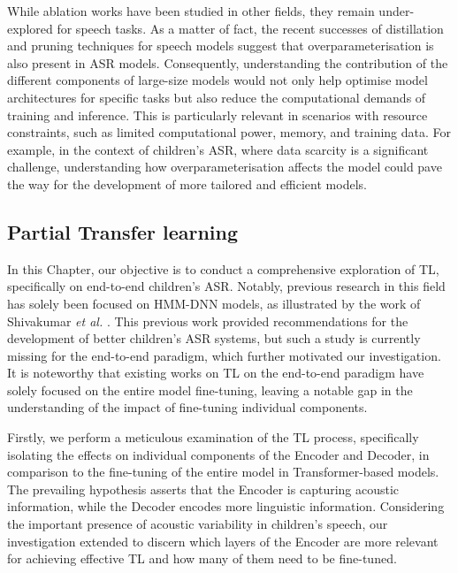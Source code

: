 While ablation works have been studied in other fields, they remain under-explored for speech tasks. As a matter of fact, the recent successes of distillation and pruning techniques for speech models \cite{gandhi2023distilwhisper,chang2022distilhubert,peng23c_interspeech} suggest that overparameterisation is also present in \ac{ASR} models. Consequently, understanding the contribution of the different components of large-size models would not only help optimise model architectures for specific tasks but also reduce the computational demands of training and inference. This is particularly relevant in scenarios with resource constraints, such as limited computational power, memory, and training data. For example, in the context of children's \ac{ASR}, where data scarcity is a significant challenge, understanding how overparameterisation affects the model could pave the way for the development of more tailored and efficient models. %


\subsection{Partial Transfer learning}
In this Chapter, our objective is to conduct a comprehensive exploration of \ac{TL}, specifically on end-to-end children's \ac {ASR}. Notably, previous research in this field has solely been focused on \ac{HMM-DNN} models, as illustrated by the work of Shivakumar \textit{et al.} \cite{shivakumar2020transfer}. This previous work provided recommendations for the development of better children's \ac{ASR} systems, but such a study is currently missing for the end-to-end paradigm, which further motivated our investigation. It is noteworthy that existing works on \ac{TL} on the end-to-end paradigm have solely focused on the entire model fine-tuning, leaving a notable gap in the understanding of the impact of fine-tuning individual components. 

Firstly, we perform a meticulous examination of the \ac{TL} process, specifically isolating the effects on individual components of the Encoder and Decoder, in comparison to the fine-tuning of the entire model in Transformer-based models. The prevailing hypothesis asserts that the Encoder is capturing acoustic information, while the Decoder encodes more linguistic information. Considering the important presence of acoustic variability in children's speech, our investigation extended to discern which layers of the Encoder are more relevant for achieving effective \ac{TL} and how many of them need to be fine-tuned.


